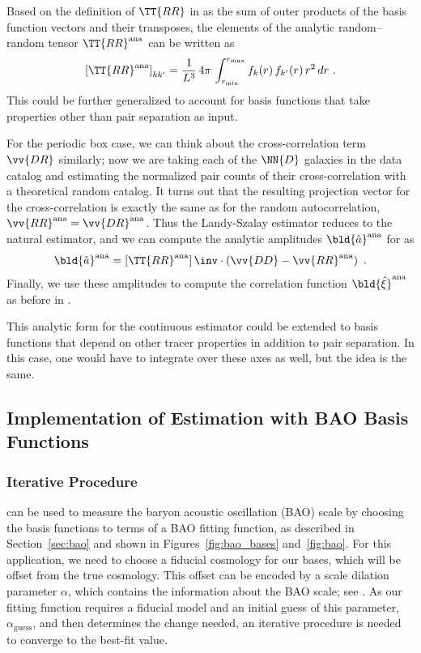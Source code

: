 Based on the definition of $\TT{RR}$ in  as the sum of outer products of the basis function vectors and their transposes, the elements of the analytic random--random tensor $\TT{RR}^\mathrm{ana}$ can be written as
\begin{equation}
\left[ \TT{RR}^\mathrm{ana} \right]_{kk'} = \frac{1}{L^3} \, 4\pi \, \int_{r_\mathrm{min}}^{r_\mathrm{max}} f_k(r) \, f_{k'}(r) \, r^2 \, dr ~.
\end{equation}
This could be further generalized to account for basis functions that take properties other than pair separation as input.

For the periodic box case, we can think about the cross-correlation term $\vv{DR}$ similarly; now we are taking each of the $\NN{D}$ galaxies in the data catalog and estimating the normalized pair counts of their cross-correlation with a theoretical random catalog.
It turns out that the resulting projection vector for the cross-correlation is exactly the same as for the random autocorrelation, $\vv{RR}^\mathrm{ana}  = \vv{DR}^\mathrm{ana}$.
Thus the Landy-Szalay estimator reduces to the natural estimator, and we can compute the analytic amplitudes $\bld{\hat a}^{\mathrm{ana}}$ for \est as
\begin{equation}
\bld{\hat a}^{\mathrm{ana}} = \left[ \TT{RR}^\mathrm{ana} \right]\inv \cdot \left( \vv{DD} - \vv{RR}^\mathrm{ana} \right) ~.
\end{equation}
Finally, we use these amplitudes to compute the correlation function $\bld{\hat{\xi}}^{\mathrm{ana}}$ as before in .

This analytic form for the continuous estimator could be extended to basis functions that depend on other tracer properties in addition to pair separation.
In this case, one would have to integrate over these axes as well, but the idea is the same.


\subsection{Implementation of Estimation with BAO Basis Functions}\label{sec:baoiter}

\subsubsection{Iterative Procedure}

\Est can be used to measure the baryon acoustic oscillation (BAO) scale by choosing the basis functions to terms of a BAO fitting function, as described in Section~\ref{sec:bao} and shown in Figures~\ref{fig:bao_bases} and~\ref{fig:bao}.
For this application, we need to choose a fiducial cosmology for our bases, which will be offset from the true cosmology.
This offset can be encoded by a scale dilation parameter $\alpha$, which contains the information about the BAO scale; see . 
As our fitting function requires a fiducial model and an initial guess of this parameter, $\alpha_\mathrm{guess}$, and then determines the change needed, an iterative procedure is needed to converge to the best-fit value.


